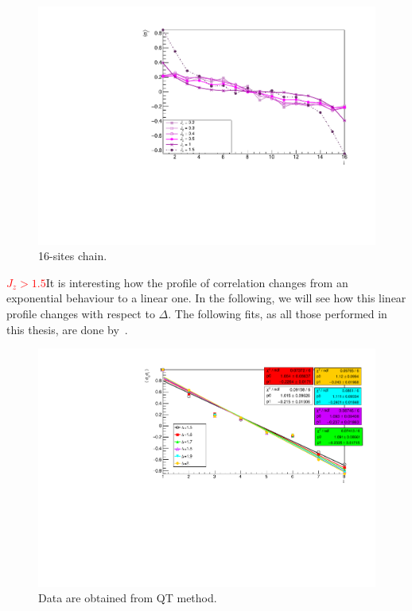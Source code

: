 \begin{figure}[H]
    \centering
    \includegraphics[scale=0.7]{Figures/16sites/16sites_LMvsLOWJz.pdf}
    \caption{16-sites chain.}
    \label{fig:my_label}
\end{figure}

\textcolor{red}{$J_z > 1.5$}It is interesting how the profile of correlation changes from an exponential behaviour to a linear one. In the following, we will see how this linear profile changes with respect to $\Delta$. The following fits, as all those performed in this thesis, are done by~\cite{root_cern}.
\begin{figure}[H]
    \centering
    \includegraphics[scale=0.7]{Figures/8sites/FIT8sCorrFunc1_MPO_over15.pdf}
    \caption{Data are obtained from QT method.}
    \label{fig:my_label}
\end{figure}